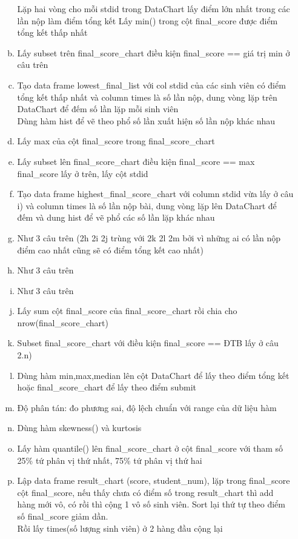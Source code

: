 \documentclass[a4paper]{article}
\theoremstyle{definition}
\begin{document}
\begin{enumerate}
\begin{enumerate}[a)]
Lặp hai vòng cho mỗi stdid trong DataChart lấy điểm lớn nhất trong các lần nộp làm điểm tổng kết
Lấy min() trong cột final\_score được điểm tổng kết thấp nhất
    \item Lấy subset trên final\_score\_chart điều kiện final\_score == giá trị min ở câu trên
    \item Tạo data frame lowest\_final\_list với col stdid của các sinh viên có điểm tổng kết thấp nhất và column times là số lần nộp, dung vòng lặp trên DataChart để đếm số lần lặp mỗi sinh viên \\
    Dùng hàm hist để vẽ theo phổ số lần xuất hiện số lần nộp khác nhau
    \item Lấy max của cột final\_score trong final\_score\_chart
    \item Lấy subset lên final\_score\_chart điều kiện final\_score == max final\_score lấy ở trên, lấy cột stdid 
    \item Tạo data frame highest\_final\_score\_chart với column stdid vừa lấy ở câu i) và column times là số lần nộp bài, dung vòng lặp lên DataChart để đếm và dung hist để vẽ phổ các số lần lặp khác nhau
    \item Như 3 câu trên (2h 2i 2j trùng với 2k 2l 2m bởi vì những ai có lần nộp điểm cao nhất cũng sẽ có điểm tổng kết cao nhất)
    \item Như 3 câu trên 
    \item Như 3 câu trên 
    \item Lấy sum cột final\_score của final\_score\_chart rồi chia cho nrow(final\_score\_chart)
    \item Subset final\_score\_chart với điều kiện final\_score == ĐTB lấy ở câu 2.n)
    \item Dùng hàm min,max,median lên cột DataChart để lấy theo điểm tổng kết hoặc final\_score\_chart để lấy theo điểm submit
    \item Độ phân tán: đo phương sai, độ lệch chuẩn với range của dữ liệu hàm
    \item Dùng hàm skewness() và kurtosis
    \item Lấy hàm quantile() lên final\_score\_chart ở cột final\_score với tham số 25\% tứ phân vị thứ nhất, 75\% tứ phân vị thứ hai
    \item Lập data frame result\_chart (score, student\_num), lặp trong final\_score cột final\_score, nếu thấy chưa có điểm số trong result\_chart thì add hàng mới vô, có rồi thì cộng 1 vô số sinh viên. Sort lại thứ tự theo điểm số final\_score giảm dần.\\
    Rồi lấy times(số lượng sinh viên) ở 2 hàng đầu cộng lại

\end{enumerate}
\end{enumerate}
\end{document}
